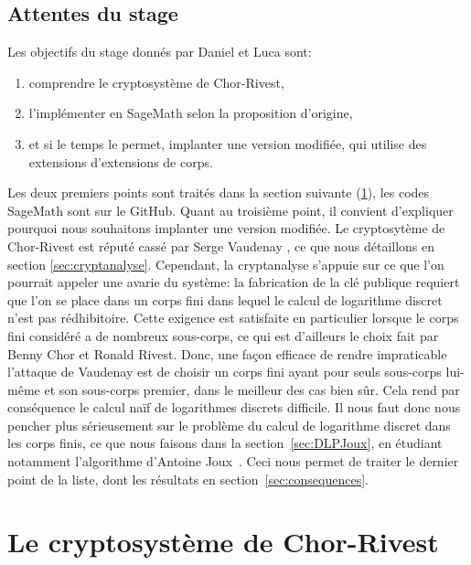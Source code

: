 \documentclass[a4paper, titlepage, 11pt]{article}
\theoremstyle{definition}
\theoremstyle{remark}
\begin{document}
\subsection{Attentes du stage}

Les objectifs du stage donnés par Daniel et Luca sont:\begin{enumerate}
\item comprendre le cryptosystème de Chor-Rivest,
\item l’implémenter en SageMath selon la proposition d'origine,
\item et si le temps le permet, implanter une version modifiée, qui utilise des extensions d'extensions de corps.
\end{enumerate}
Les deux premiers points sont traités dans la section suivante (\ref{sec:cryptosysteme}), les codes SageMath sont sur le GitHub. Quant au troisième point, il convient d'expliquer pourquoi nous souhaitons implanter une version modifiée. Le cryptosytème de Chor-Rivest \cite{chorRivest1988} est réputé \og{}cassé \fg{} par Serge Vaudenay \cite{vaudenay2000}, ce que nous détaillons en section \ref{sec:cryptanalyse}. Cependant, la cryptanalyse s’appuie sur ce que l'on pourrait appeler une avarie du système: la fabrication de la clé publique requiert que l'on se place dans un corps fini dans lequel le calcul de logarithme discret n'est pas rédhibitoire. Cette exigence est satisfaite en particulier lorsque le corps fini considéré a de nombreux sous-corps, ce qui est d'ailleurs le choix fait par Benny Chor et Ronald Rivest. Donc, une façon efficace de rendre impraticable l'attaque de Vaudenay est de choisir un corps fini ayant pour seuls sous-corps lui-même et son sous-corps premier, dans le meilleur des cas bien sûr. Cela rend par conséquence le calcul \og{}naïf \fg{} de logarithmes discrets difficile. Il nous faut donc nous pencher plus sérieusement sur le problème du calcul de logarithme discret dans les corps finis, ce que nous faisons dans la section~\ref{sec:DLPJoux}, en étudiant notamment l'algorithme d'Antoine Joux~\cite{joux2013}. Ceci nous permet de traiter le dernier point de la liste, dont les résultats en section~\ref{sec:consequences}.


\section{Le cryptosystème de Chor-Rivest}\label{sec:cryptosysteme}
\end{document}
